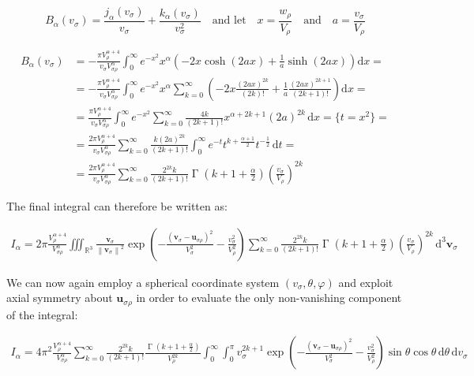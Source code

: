 \begin{equation*}
    B_\alpha(v_\sigma)=\frac{j_\alpha(v_\sigma)}{v_\sigma}+\frac{k_\alpha(v_\sigma)}{v_\sigma^2}\quad\text{and let}\quad x=\frac{w_\rho}{V_\rho}\quad\text{and}\quad a=\frac{v_\sigma}{V_\rho}
\end{equation*}

\begin{align*}
    B_\alpha(v_\sigma)&=-\frac{\pi V_\rho^{\alpha+4}}{v_\sigma V_{\sigma\rho}^\alpha}\int_0^\infty e^{-x^2}x^\alpha \left(-2x \cosh{\left(2ax\right)}+\frac{1}{a}\sinh{\left(2ax\right)}\right)\mathrm{d}x=\\
    &=-\frac{\pi V_\rho^{\alpha+4}}{v_\sigma V_{\sigma\rho}^\alpha}\int_0^\infty e^{-x^2}x^\alpha\sum_{k=0}^\infty\left(-2x\frac{(2ax)^{2k}}{(2k)!}+\frac{1}{a}\frac{(2ax)^{2k+1}}{(2k+1)!}\right)\mathrm{d}x=\\
    &=\frac{\pi V_\rho^{\alpha+4}}{v_\sigma V_{\sigma\rho}^\alpha}\int_0^\infty e^{-x^2}\sum_{k=0}^\infty \frac{4k}{(2k+1)!}x^{\alpha+2k+1}(2a)^{2k}\,\mathrm{d}x=\bigg\{t=x^2\bigg\}=\\
    &=\frac{2\pi V_\rho^{\alpha+4}}{v_\sigma V_{\sigma\rho}^\alpha}\sum_{k=0}^\infty\frac{k(2a)^{2k}}{(2k+1)!}\int_0^\infty e^{-t}t^{k+\frac{\alpha+1}{2}}t^{-\frac{1}{2}}\,\mathrm{d}t=\\
    &=\frac{2\pi V_\rho^{\alpha+4}}{v_\sigma V_{\sigma\rho}^\alpha}\sum_{k=0}^\infty \frac{2^{2k}k}{(2k+1)!}\operatorname{\Gamma}{\left(k+1+\frac{\alpha}{2}\right)}\left(\frac{v_\sigma}{V_\rho}\right)^{2k}
\end{align*}

The final integral can therefore be written as:

\begin{align*}
    I_\alpha=2\pi\frac{V_\rho^{\alpha+4}}{V_{\sigma\rho}^\alpha}\iiint_{\mathbb{R}^3}\frac{\mathbf{v}_\sigma}{\left\|\mathbf{v}_\sigma\right\|^2}\exp{\left(-\frac{\left(\mathbf{v}_\sigma-\mathbf{u}_{\sigma\rho}\right)^2}{V_\sigma^2}-\frac{v_\sigma^2}{V_\rho^2}\right)}\sum_{k=0}^\infty \frac{2^{2k}k}{(2k+1)!}\operatorname{\Gamma}{\left(k+1+\frac{\alpha}{2}\right)}\left(\frac{v_\sigma}{V_\rho}\right)^{2k}\,\mathrm{d^3}\mathbf{v}_\sigma
\end{align*}

We can now again employ a spherical coordinate system $(v_\sigma,\theta,\varphi)$ and exploit axial symmetry about $\mathbf{u}_{\sigma\rho}$ in order to evaluate the only non-vanishing component of the integral:

\begin{align*}
    I_\alpha=4\pi^2\frac{V_\rho^{\alpha+4}}{V_{\sigma\rho}^\alpha}\sum_{k=0}^\infty\frac{2^{2k}k}{(2k+1)!}\frac{\operatorname{\Gamma}{\left(k+1+\frac{\alpha}{2}\right)}}{V_\rho^{2k}}\int_0^\infty\int_0^\pi v_\sigma^{2k+1}\exp{\left(-\frac{\left(\mathbf{v}_\sigma-\mathbf{u}_{\sigma\rho}\right)^2}{V_{\sigma}^2}-\frac{v_\sigma^2}{V_\rho^2}\right)}\sin{\theta}\cos{\theta}\,\mathrm{d}\theta\,\mathrm{d}v_\sigma
\end{align*}

